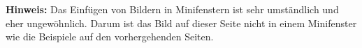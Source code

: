 
\textbf{Hinweis:} Das Einfügen von Bildern in Minifenstern ist sehr umständlich und eher ungewöhnlich. Darum ist das Bild auf dieser Seite nicht in einem Minifenster wie die Beispiele auf den vorhergehenden Seiten.
